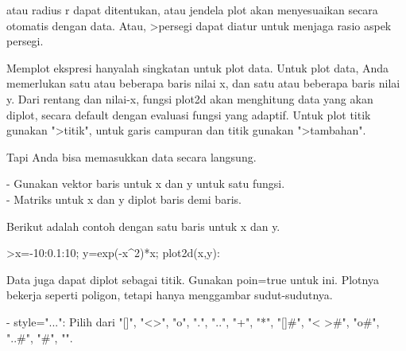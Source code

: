 \documentclass{article}
\begin{document}
\begin{eulernotebook}
\begin{eulercomment}
\begin{eulercomment}
\begin{eulercomment}
\begin{eulercomment}
\begin{eulercomment}
\begin{eulercomment}
\begin{eulercomment}
\begin{eulercomment}
\begin{eulercomment}
\begin{eulercomment}
\begin{eulercomment}
\begin{eulercomment}
\begin{eulercomment}
\begin{eulercomment}
\begin{eulercomment}
\begin{eulercomment}
\begin{eulercomment}
\begin{eulercomment}
\begin{eulercomment}
\begin{eulercomment}
\begin{eulercomment}
atau radius r dapat ditentukan, atau jendela plot akan menyesuaikan
secara otomatis dengan data. Atau, \textgreater{}persegi dapat diatur untuk menjaga
rasio aspek persegi.

Memplot ekspresi hanyalah singkatan untuk plot data. Untuk plot data,
Anda memerlukan satu atau beberapa baris nilai x, dan satu atau
beberapa baris nilai y. Dari rentang dan nilai-x, fungsi plot2d akan
menghitung data yang akan diplot, secara default dengan evaluasi
fungsi yang adaptif. Untuk plot titik gunakan "\textgreater{}titik", untuk garis
campuran dan titik gunakan "\textgreater{}tambahan".

Tapi Anda bisa memasukkan data secara langsung.

- Gunakan vektor baris untuk x dan y untuk satu fungsi.\\
- Matriks untuk x dan y diplot baris demi baris.

Berikut adalah contoh dengan satu baris untuk x dan y.
\end{eulercomment}
\begin{eulerprompt}
>x=-10:0.1:10; y=exp(-x^2)*x; plot2d(x,y):
\end{eulerprompt}
\begin{eulercomment}
Data juga dapat diplot sebagai titik. Gunakan poin=true untuk ini.
Plotnya bekerja seperti poligon, tetapi hanya menggambar
sudut-sudutnya.

- style="...": Pilih dari "[]", "\textless{}\textgreater{}", "o", ".", "..", "+", "*", "[]#",
"\textless{} \textgreater{}#", "o#", "..#", "#", "\textbar{}".


\end{eulercomment}
\end{eulercomment}
\end{eulercomment}
\end{eulercomment}
\end{eulercomment}
\end{eulercomment}
\end{eulercomment}
\end{eulercomment}
\end{eulercomment}
\end{eulercomment}
\end{eulercomment}
\end{eulercomment}
\end{eulercomment}
\end{eulercomment}
\end{eulercomment}
\end{eulercomment}
\end{eulercomment}
\end{eulercomment}
\end{eulercomment}
\end{eulercomment}
\end{eulercomment}
\end{eulernotebook}
\end{document}

